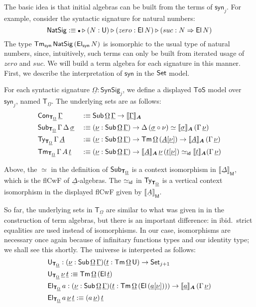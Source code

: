 \documentclass[sigplan,review,anonymous]{acmart}\settopmatter{printfolios=true,printccs=false,printacmref=false}
\newcommand{\ToS}{\mathsf{ToS}}
\newcommand{\ext}{\triangleright}
\newcommand{\emptycon}{\scaleobj{.75}\bullet}
\newcommand{\NatSig}{\mathsf{NatSig}}
\newcommand{\arri}{\Rightarrow}
\newcommand{\syn}{\mathsf{syn}}
\newcommand{\SynSig}{\mathsf{SynSig}}
\newcommand{\bA}{\boldsymbol{A}}
\newcommand{\bM}{\boldsymbol{\mathsf{M}}}
\newcommand{\bT}{\boldsymbol{\mathsf{T}}}
\newcommand{\ul}[1]{\underline{#1}}
\newcommand{\ulGamma}{\ul{\Gamma}}
\newcommand{\ulDelta}{\ul{\Delta}}
\newcommand{\ulOmega}{\ul{\Omega}}
\newcommand{\ulsigma}{\ul{\sigma}}
\newcommand{\ulnu}{\ul{\nu}}
\newcommand{\ult}{\ul{t}}
\newcommand{\ulA}{\ul{A}}
\newcommand{\ula}{\ul{a}}
\newcommand{\llb}{\llbracket}
\newcommand{\rrb}{\rrbracket}
\begin{document}
The basic idea is that initial algebras can be built from the terms of $\syn_j$.
For example, consider the syntactic signature for natural numbers:
\[
\NatSig :\equiv \emptycon\ext(N : \U)\ext(zero : \El\,N)\ext (suc : N
\arri \El\,N)
\]
The type $\Tm_{\syn}\,\NatSig\,(\El_{\syn}\,N)$ is isomorphic to the usual type
of natural numbers, since, intuitively, such terms can only be built from
iterated usage of $zero$ and $suc$. We will build a term algebra for each
signature in this manner. First, we describe the interpretation of $\syn$ in the
$\mathsf{Set}$ model.

\begin{definition}
For each syntactic signature $\ulOmega : \SynSig_j$, we define a displayed $\ToS$
model over $\syn_j$, named $\bT_{\ulOmega}$. The underlying sets are as follows:
\begin{alignat*}{3}
  & \Con_{\bT_{\ulOmega}}\,\ulGamma &&:\equiv \Sub\,\ulOmega\,\ulGamma \ra \llb\ulGamma\rrb_{\bA}\\
  & \Sub_{\bT_{\ulOmega}}\,\Gamma\,\Delta\,\ulsigma &&:\equiv (\ulnu : \Sub\,\ulOmega\,\ulGamma)
  \ra \Delta\,(\ulsigma\circ\nu) \simeq \llb\ulsigma\rrb_{\bA}\,(\Gamma\,\ulnu)\\
  & \Ty_{\bT_{\ulOmega}}\,\Gamma\,\ulA &&:\equiv (\ulnu : \Sub\,\ulOmega\,\ulGamma) \ra
    \Tm\,\ulOmega\,(\ulA[\ulnu]) \ra \llb\ulA\rrb_{\bA}\,(\Gamma\,\ulnu)\\
  & \Tm_{\bT_{\ulOmega}}\,\Gamma\,A\,\ult &&:\equiv (\ulnu : \Sub\,\ulOmega\,\ulGamma)\ra
    \llb\ulA\rrb_{\bA}\,\ulnu\,(\ult[\ulnu]) \simeq_{\id} \llb\ult\rrb_{\bA} (\Gamma\,\ulnu)
\end{alignat*}

Above, the $\simeq$ in the definition of $\Sub_{\bT_{\ulOmega}}$ is a context isomorphism
in $\llb\ulDelta\rrb_{\bM}$, which is the flCwF of $\ulDelta$-algebras. The
$\simeq_{\mathsf{id}}$ in $\Ty_{\bT_{\ulOmega}}$ is a vertical context isomorphism in the displayed
flCwF given by $\llb\ulA\rrb_{\bM}$.

So far, the underlying sets in $\bT_{\ulOmega}$ are similar to what was given in
\cite{kaposi2019constructing} in the construction of term algebras, but there is
an important difference: in ibid.\, strict equalities are used instead of
isomorphisms. In our case, isomorphisms are necessary once again because of
infinitary functions types and our identity type; we shall see this shortly. The
universe is interpreted as follows:
\begin{alignat*}{3}
  & \U_{\bT_{\ulOmega}} : (\ulnu : \Sub\,\ulOmega\,\ulGamma)(\ult : \Tm\,\ulOmega\,\U)\ra
              \Set_{j+1}\\
  & \U_{\bT_{\ulOmega}}\,\ulnu\,\ult :\equiv \Tm\,\ulOmega\,(\El\,\ult)\\
  & \El_{\bT_{\ulOmega}}\,a : (\ulnu : \Sub\,\ulOmega\,\ulGamma)
             (\ult : \Tm\,\ulOmega\,(\El\,(\ula[\ulnu])))\ra
              \llb\ula\rrb_{\bA}\,(\Gamma\,\ulnu)\\
  & \El_{\bT_{\ulOmega}}\,a\,\ulnu\,\ult :\equiv (a\,\ulnu)\,\ult
\end{alignat*}


\end{definition}
\end{document}
